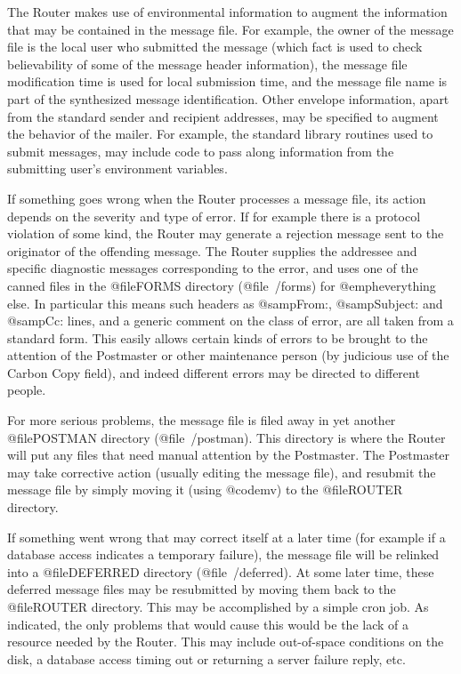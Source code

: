 The Router makes use of environmental information to augment
the information that may be contained in the message file.
For example, the owner of the message file is the local user
who submitted the message (which fact is used to check believability
of some of the message header information), the message file
modification time is used for local submission time, and the
message file name is part of the synthesized message identification.
Other envelope information, apart from the standard sender and
recipient addresses, may be specified to augment the behavior
of the mailer.
For example, the standard library routines used to submit messages,
may include code to pass along information from the submitting user's
environment variables.

If something goes wrong when the Router processes a message
file, its action depends on the severity and type of error.
If for example there is a protocol violation of some kind,
the Router may generate a rejection message sent to the originator
of the offending message.
The Router supplies the addressee and specific diagnostic
messages corresponding to the error, and uses one of the
canned files in the @file{FORMS} directory (@file{~/forms})
for @emph{everything else}.
In particular this means such headers as @samp{From:},
@samp{Subject:} and @samp{Cc:} lines, and a generic comment
on the class of error, are all taken from a standard form.
This easily allows certain kinds of errors to be brought to
the attention of the Postmaster or other maintenance person
(by judicious use of the Carbon Copy field), and indeed
different errors may be directed to different people.

For more serious problems, the message file is filed away
in yet another @file{POSTMAN} directory (@file{~/postman}).
This directory is where the Router will put any files that
need manual attention by the Postmaster.
The Postmaster may take corrective action (usually editing
the message file), and resubmit the message file by simply
moving it (using @code{mv}) to the @file{ROUTER} directory.

If something went wrong that may correct itself at a later
time (for example if a database access indicates a temporary
failure), the message file will be relinked into a @file{DEFERRED}
directory (@file{~/deferred}).
At some later time, these deferred message files may be
resubmitted by moving them back to the @file{ROUTER} directory.
This may be accomplished by a simple cron job.
As indicated, the only problems that would cause this would be
the lack of a resource needed by the Router.
This may include out-of-space conditions on the disk, a database
access timing out or returning a server failure reply, etc.

